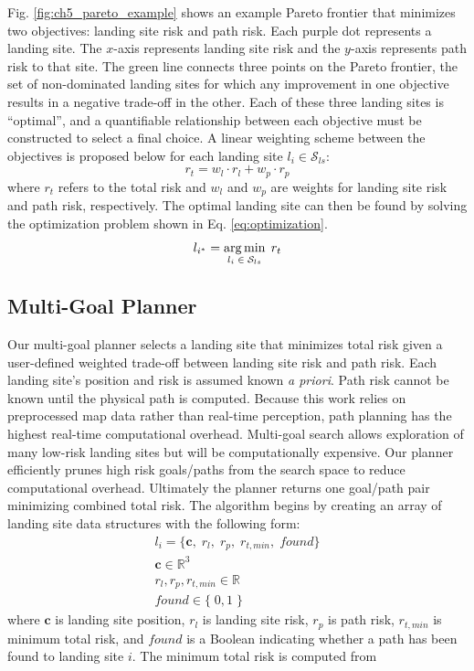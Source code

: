 Fig. \ref{fig:ch5_pareto_example} shows an example Pareto frontier that minimizes two objectives: landing site risk and path risk.  Each purple dot represents a landing site. The $x$-axis represents landing site risk and the $y$-axis represents path risk to that site. 
The green line connects three points on the Pareto frontier, the set of non-dominated landing sites for which any improvement in one objective results in a negative trade-off in the other. Each of these three landing sites is ``optimal'', and a quantifiable relationship between each objective must be constructed to select a final choice. A linear weighting scheme between the objectives is proposed below for each landing site $l_i \in \mathcal{S}_{ls} $:
\begin{equation}\label{eq:total_risk}
    r_{t} = w_l \cdot r_{l} + w_p \cdot r_{p}
\end{equation}
where $r_{t}$ refers to the total risk and $w_l$ and $w_p$ are weights for landing site risk and path risk, respectively. The optimal landing site can then be found by solving the optimization problem shown in Eq. \ref{eq:optimization}.
\begin{equation}
    l_{i^*} = \operatorname*{arg\,min}_{l_i \; \in \; \mathcal{S}_{ls}} \; r_{t}\label{eq:optimization}
\end{equation}

\subsection{Multi-Goal Planner}\label{sec:ch5_multi_goal_search_all}

Our multi-goal planner selects a landing site that minimizes total risk given a user-defined weighted trade-off between landing site risk and path risk. Each landing site's position and risk is assumed known \emph{a priori}. Path risk cannot be known until the physical path is computed. Because this work relies on preprocessed map data rather than real-time perception, path planning has the highest real-time computational overhead.
Multi-goal search allows exploration of many low-risk landing sites but will be computationally expensive. Our planner efficiently prunes high risk goals/paths from the search space to reduce computational overhead.  Ultimately the planner returns one goal/path pair minimizing combined total risk.
The algorithm begins by creating an array of landing site data structures with the following form:
\begin{align}
    l_i = \{ \mathbf{c},\; r_{l}, \;r_{p}, \; r_{t,min}, \; found \} \\
    \mathbf{c} \in \mathbb{R}^3 \\
    r_{l}, r_{p}, r_{t,min} \in \mathbb{R} \\
    found \in \{\; 0, 1 \; \} 
\end{align}
where $\mathbf{c}$ is landing site position, $r_{l}$ is landing site risk, $r_{p}$ is path risk, $r_{t,min}$ is minimum total risk, and $found$ is a Boolean indicating whether a path has been found to landing site $i$. The minimum
total risk is computed from

